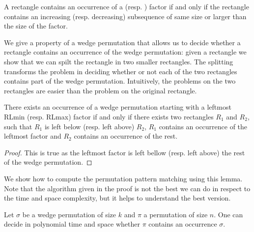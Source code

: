 \documentclass[a4paper]{llncs}
\newcommand{\RLMin}{\text{RLMin}}
\newcommand{\RLMax}{\text{RLMax}}
\begin{document}
\begin{remark}
A rectangle contains
an occurrence of a \RLMin (resp. \RLMax) factor if and only if
the rectangle contains an increasing (resp. decreasing) subsequence
of same size or larger than the size of the factor.
\end{remark}

We give a property of a wedge permutation that
allows us to decide whether a rectangle
contains an occurrence of the wedge permutation:
given a rectangle we show that we can spilt the
rectangle in two smaller rectangles.
The splitting transforms the problem
in deciding whether or not each of the two rectangles
contains part of the wedge permutation.
Intuitively, the problems on the two rectangles
are easier than the problem on the original rectangle.

\begin{lemma}
There exists an occurrence of a wedge permutation
starting with a leftmost RLmin (resp. RLmax) factor
if and only if
there exists two rectangles $R_1$ and $R_2$,
such that $R_1$ is left below (resp. left above) $R_2$,
$R_1$ contains an occurrence of the leftmost factor
and $R_2$ contains an occurrence of the rest.
\end{lemma}

\begin{proof}
This is true as the leftmost factor is left bellow (resp. left above)
the rest of the wedge permutation.
\end{proof}

We show how to compute the permutation pattern matching
using this lemma. Note that the algorithm given in the proof is not the best we can do
in respect to the time and space complexity,
but it helps to understand the best version.

\begin{lemma}
Let $\sigma$ be a wedge permutation of size $k$
and $\pi$ a permutation of size $n$.
One can decide in polynomial time and space whether
$\pi$ contains an occurrence $\sigma$.
\end{lemma}
\end{document}
